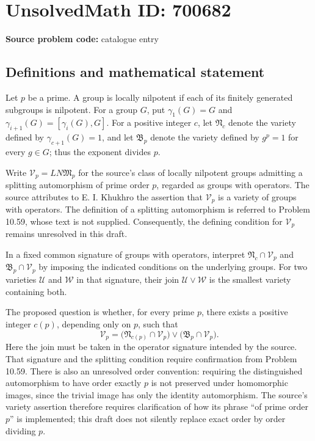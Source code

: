 \documentclass[11pt]{article}
\begin{document}
\section*{UnsolvedMath ID: 700682}
\textbf{Source problem code:} catalogue entry
\subsection{Definitions and mathematical statement}
Let \(p\) be a prime. A group is locally nilpotent if each of its finitely generated subgroups is nilpotent. For a group \(G\), put \(\gamma_1(G)=G\) and \(\gamma_{i+1}(G)=[\gamma_i(G),G]\). For a positive integer \(c\), let \(\mathfrak N_c\) denote the variety defined by \(\gamma_{c+1}(G)=1\), and let \(\mathfrak B_p\) denote the variety defined by \(g^p=1\) for every \(g\in G\); thus the exponent divides \(p\).

Write \(\mathcal V_p=LN\mathfrak M_p\) for the source's class of locally nilpotent groups admitting a splitting automorphism of prime order \(p\), regarded as groups with operators. The source attributes to E. I. Khukhro the assertion that \(\mathcal V_p\) is a variety of groups with operators. The definition of a splitting automorphism is referred to Problem 10.59, whose text is not supplied. Consequently, the defining condition for \(\mathcal V_p\) remains unresolved in this draft.

In a fixed common signature of groups with operators, interpret \(\mathfrak N_c\cap\mathcal V_p\) and \(\mathfrak B_p\cap\mathcal V_p\) by imposing the indicated conditions on the underlying groups. For two varieties \(\mathcal U\) and \(\mathcal W\) in that signature, their join \(\mathcal U\vee\mathcal W\) is the smallest variety containing both.

The proposed question is whether, for every prime \(p\), there exists a positive integer \(c(p)\), depending only on \(p\), such that
\[
\mathcal V_p
=
\bigl(\mathfrak N_{c(p)}\cap\mathcal V_p\bigr)
\vee
\bigl(\mathfrak B_p\cap\mathcal V_p\bigr).
\]
Here the join must be taken in the operator signature intended by the source. That signature and the splitting condition require confirmation from Problem 10.59. There is also an unresolved order convention: requiring the distinguished automorphism to have order exactly \(p\) is not preserved under homomorphic images, since the trivial image has only the identity automorphism. The source's variety assertion therefore requires clarification of how its phrase ``of prime order \(p\)'' is implemented; this draft does not silently replace exact order by order dividing \(p\).
\end{document}
